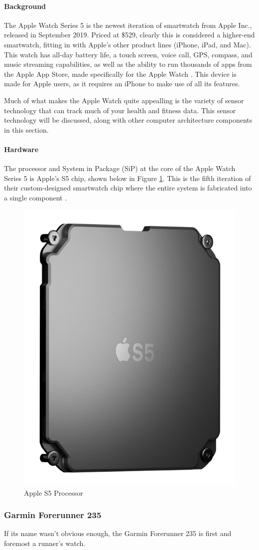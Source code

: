 \paragraph{Background}
The Apple Watch Series 5 is the newest iteration of smartwatch from Apple Inc., released in September
2019. Priced at \$529, clearly this is considered a higher-end smartwatch, fitting in with Apple's
other product lines (iPhone, iPad, and Mac). This watch has all-day battery life, a touch screen, 
voice call, GPS, compass, and music streaming capabilities, as well as the ability to run thousands of
apps from the Apple App Store, made specifically for the Apple Watch \cite{apple_specs}. This device
is made for Apple users, as it requires an iPhone to make use of all its features.

Much of what makes the Apple Watch quite appealling is the variety of sensor technology that can track
much of your health and fitness data. This sensor technology will be discussed, along with other
computer architecture components in this section.

\paragraph{Hardware}
The processor and System in Package (SiP) at the core of the Apple Watch Series 5 is Apple's S5 chip,
shown below in Figure \ref{fig:s5chip}. This is the fifth iteration of their custom-designed 
smartwatch chip where the entire system is fabricated into a single component \cite{apple_specs}.

\begin{figure}[h]
    \centering
    \includegraphics[width=.1\linewidth]{media/apple_s5_chip.png}
    \caption{Apple S5 Processor \cite{apple_s5_pic}}
    \label{fig:s5chip}
\end{figure}

\subsubsection{Garmin Forerunner 235}
If its name wasn't obvious enough, the Garmin Forerunner 235 is first and foremost a runner's
watch.